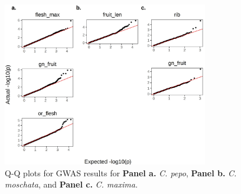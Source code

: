 \documentclass[utf8]{frontiers_suppmat} %
\begin{document}
\clearpage

\begin{figure}[h]
	\begin{center}
		\includegraphics[width=0.8\textwidth]{../supplemental/03_subfig}%
	\end{center}
	\caption{Q-Q plots for GWAS results for \textbf{Panel a.} \textit{C. pepo}, \textbf{Panel b.} \textit{C. moschata}, and \textbf{Panel c.} \textit{C. maxima.}\label{fig:2}}
\end{figure}

\newpage
\end{document}
